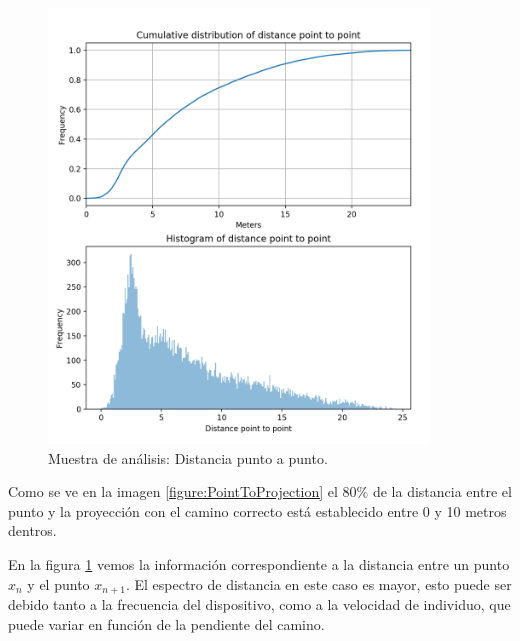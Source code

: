 \begin{figure}[!htb]
\begin{minipage}{0.48\textwidth}
\includegraphics[width=0.9\textwidth]{./Imagenes/PointToPoint.png}
\caption{Muestra de análisis: Distancia punto a punto.}
\label{figure:PointToPoint}
\end{minipage}
\end{figure}
\pagebreak

Como se ve en la imagen \ref{figure:PointToProjection} el 80\% de la distancia entre el punto y la 
proyección con el camino correcto está establecido entre 0 y 10 metros dentros.

En la figura \ref{figure:PointToPoint} vemos la información correspondiente a la distancia 
entre un punto $x_{n}$ y el punto $x_{n+1}$. El espectro de distancia en este caso es mayor, 
esto puede  ser debido  tanto a la frecuencia del dispositivo, como a la velocidad de individuo, que puede variar en función de la pendiente del camino.